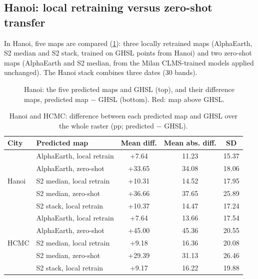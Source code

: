 \subsection{Hanoi: local retraining versus zero-shot transfer}
\label{sec:res-hanoi}

In Hanoi, five maps are compared (\cref{fig:hanoi-maps}): three locally
retrained maps (AlphaEarth, S2 median and S2 stack, trained on GHSL points
from Hanoi) and two zero-shot maps (AlphaEarth and S2 median, from the Milan
CLMS-trained models applied unchanged). The Hanoi stack combines three
dates (30 bands).

\begin{figure}[htbp]
  \centering
  \caption{Hanoi: the five predicted maps and GHSL (top), and their
  difference maps, predicted map $-$ GHSL (bottom). Red: map above GHSL.}
  \label{fig:hanoi-maps}
\end{figure}

\begin{table}[htbp]
  \centering
  \small
  \caption{Hanoi and HCMC: difference between each predicted map and GHSL
  over the whole raster (pp; predicted $-$ GHSL).}
  \label{tab:viet-diff}
  \begin{tabular}{llccc}
    \toprule
    City & Predicted map & Mean diff. & Mean abs. diff. & SD \\
    \midrule
    \multirow{5}{*}{Hanoi}
      & AlphaEarth, local retrain & +7.64 & 11.23 & 15.37 \\
      & AlphaEarth, zero-shot     & +33.65 & 34.08 & 18.06 \\
      & S2 median, local retrain  & +10.31 & 14.52 & 17.95 \\
      & S2 median, zero-shot      & +36.66 & 37.65 & 25.89 \\
      & S2 stack, local retrain   & +10.37 & 14.47 & 17.24 \\
    \midrule
    \multirow{5}{*}{HCMC}
      & AlphaEarth, local retrain & +7.64 & 13.66 & 17.54 \\
      & AlphaEarth, zero-shot     & +45.00 & 45.36 & 20.55 \\
      & S2 median, local retrain  & +9.18 & 16.36 & 20.08 \\
      & S2 median, zero-shot      & +29.39 & 31.13 & 26.46 \\
      & S2 stack, local retrain   & +9.17 & 16.22 & 19.88 \\
    \bottomrule
  \end{tabular}
\end{table}

